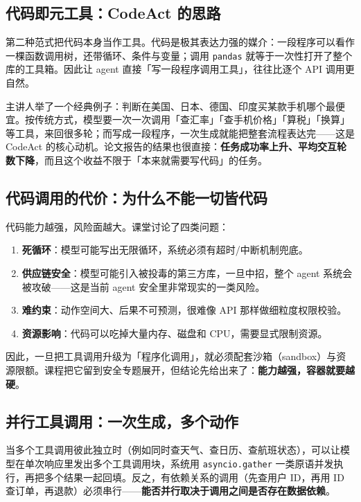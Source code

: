 \documentclass[a4paper]{article}
\begin{document}
\subsection{代码即元工具：CodeAct 的思路}

第二种范式把代码本身当作工具。代码是极其表达力强的媒介：一段程序可以看作一棵函数调用树，还带循环、条件与变量；调用 \texttt{pandas} 就等于一次性打开了整个库的工具箱。因此让 agent 直接「写一段程序调用工具」，往往比逐个 API 调用更自然。

主讲人举了一个经典例子：判断在美国、日本、德国、印度买某款手机哪个最便宜。按传统方式，模型要一次一次调用「查汇率」「查手机价格」「算税」「换算」等工具，来回很多轮；而写成一段程序，一次生成就能把整套流程表达完——这是 CodeAct 的核心动机。论文报告的结果也很直接：\textbf{任务成功率上升、平均交互轮数下降}，而且这个收益不限于「本来就需要写代码」的任务。

\subsection{代码调用的代价：为什么不能一切皆代码}

代码能力越强，风险面越大。课堂讨论了四类问题：

\begin{enumerate}
\item \textbf{死循环}：模型可能写出无限循环，系统必须有超时/中断机制兜底。
\item \textbf{供应链安全}：模型可能引入被投毒的第三方库，一旦中招，整个 agent 系统会被攻破——这是当前 agent 安全里非常现实的一类风险。
\item \textbf{难约束}：动作空间大、后果不可预测，很难像 API 那样做细粒度权限校验。
\item \textbf{资源影响}：代码可以吃掉大量内存、磁盘和 CPU，需要显式限制资源。
\end{enumerate}

因此，一旦把工具调用升级为「程序化调用」，就必须配套沙箱（sandbox）与资源限额。课程把它留到安全专题展开，但结论先给出来了：\textbf{能力越强，容器就要越硬}。

\subsection{并行工具调用：一次生成，多个动作}

当多个工具调用彼此独立时（例如同时查天气、查日历、查航班状态），可以让模型在单次响应里发出多个工具调用块，系统用 \texttt{asyncio.gather} 一类原语并发执行，再把多个结果一起回填。反之，有依赖关系的调用（先查用户 ID，再用 ID 查订单，再退款）必须串行——\textbf{能否并行取决于调用之间是否存在数据依赖}。
\end{document}
